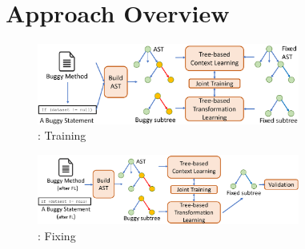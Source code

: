 \section{Approach Overview}
\label{overview:sec}

\begin{figure}[t]
	\centering
	\includegraphics[width=3.4in]{graphs/overview-training.png}
	\caption{{\tool}: Training}
	\label{overview-training}
\end{figure}

\begin{figure}[t]
	\centering
	\includegraphics[width=3.4in]{graphs/overview-predict.png}
	\caption{{\tool}: Fixing}
	\label{overview-fixing}
\end{figure}
